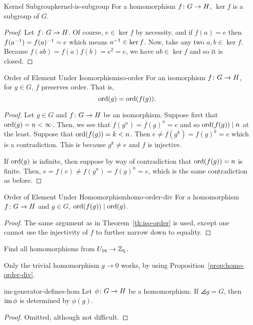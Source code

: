 \documentclass{article}
\begin{document}
\begin{proposition}{Kernel Subgroup}{kernel-is-subgroup}
  For a homomorphism $f \colon G \to H$, $\ker f$ is a subgroup of $G$.
\end{proposition}
\begin{proof}
  Let $f \colon G \to H$.
  Of course, $e \in \ker f$ by necessity, and if $f(a) = e$ then $f(a^{-1}) = f(a)^{-1} = e$
  which means $a^{-1} \in \ker f$.
  Now, take any two $a, b \in \ker f$.
  Because $f(ab) = f(a)f(b) = e^{2} = e$, we have $ab \in \ker f$ and so it is closed.
\end{proof}

\begin{theorem}{Order of Element Under Isomorphism}{iso-order}
  For an isomorphism $f \colon G \to H$, for $g \in G$, $f$ preserves order.
  That is,
  \[ \operatorname{ord}(g) = \operatorname{ord}(f(g)). \]
\end{theorem}
\begin{proof}
  Let $g \in G$ and $f \colon G \to H$ be an isomorphism.
  Suppose first that $\operatorname{ord}(g) = n < \infty$.
  Then, we see that $f(g^{n}) = f(g)^{n} = e$ and so $\operatorname{ord}(f(g)) \mid n$ at the least.
  Suppose that $\operatorname{ord}(f(g)) = k < n$. Then $e \ne f(g^{k}) = f(g)^{k} = e$
  which is a contradiction. This is because $g^{k} \ne e$ and $f$ is injective.

  If $\operatorname{ord}(g)$ is infinite, then suppose by way of contradiction that $\operatorname{ord}(f(g)) = n$ is finite.
  Then, $e = f(e) \ne f(g^{n}) = f(g)^{n} = e$, which is the same contradiction as before.
\end{proof}

\begin{proposition}{Order of Element Under Homomorphism}{homo-order-div}
  For a homomorphism $f \colon G \to H$ and $g \in G$, $\operatorname{ord}(f(g)) \mid \operatorname{ord}(g)$.
\end{proposition}
\begin{proof}
  The same argument as in Theorem~\ref{th:iso-order} is used, except one cannot use
  the injectivity of $f$ to further narrow down to equality.
\end{proof}

\begin{example}{}{}
  Find all homomorphisms from $U_{16} \to \mathbb{Z}^{}_{5}$.

  Only the trivial homomorphism $g \to 0$ works, by using Proposition~\ref{prop:homo-order-div}.
\end{example}

\begin{proposition}{}{im-generator-defines-hom}
  Let $\phi \colon G \to H$ be a homomorphism.
  If $\angles{g} = G$, then $\operatorname{im} \phi$ is determined by $\phi(g)$.
\end{proposition}
\begin{proof}
  Omitted, although not difficult.
\end{proof}
\end{document}
